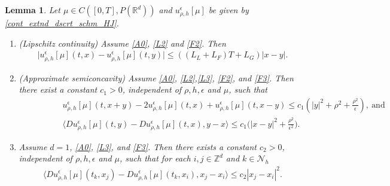 \documentclass[a4paper,  twoside, 10pt, leqno]{amsart}
\newcommand{\zd}{\mathbb{Z}^d}
\newcommand{\rd}{\mathbb{R}^d}
\newtheorem{lemma}[thm]{Lemma}
\theoremstyle{remark}
\theoremstyle{definition}
\begin{document}
\begin{lemma} \label{semiconcavity_eps}
    Let  $\mu \in  C ( [0,T], P ( \rd ))$ and $u_{\rho,h}^{\epsilon} [ \mu ]$ be given by \eqref{cont_extnd_dscrt_schm_HJ}.
\begin{enumerate}
    \item[(a)]  (Lipschitz continuity)  Assume \ref{A0}, \ref{L2} and \ref{F2}. 
         Then
 \begin{align*}
     \big|  u_{\rho, h}^{\epsilon} [ \mu ] ( t,x ) - u_{\rho, h}^{\epsilon} [ \mu ] ( t,y ) \big| \leq ( ( L_{L} + L_{F} )T + L_{G} ) |x-y|.
 \end{align*}
\item[(b)] (Approximate semiconcavity) 
        Assume \ref{A0}, \ref{L2},\ref{L3}, \ref{F2}, and \ref{F3}.
        Then  there exist a constant $c_1>0$, independent of $\rho, h, \epsilon$ and $\mu$, such that 
        \begin{align*}
            \qquad\qquad& u_{\rho, h}^{\epsilon} [ \mu ] ( t, x + y ) - 2 u_{\rho, h}^{\epsilon} [ \mu ] ( t,x ) + u_{\rho, h}^{\epsilon} [ \mu ] ( t,x - y ) \leq c_{1} (  |y|^{2} + \rho^{2} + \frac{\rho^2}{\epsilon} ), \ \mbox{and}  \\
             & \langle D u_{\rho, h}^{\epsilon} [ \mu ] (  t,y ) - D u_{\rho, h}^{\epsilon} [ \mu ] ( t,x ) , y-x \rangle \leq c_{1} \Big(|x-y|^{2} + \frac{\rho^2}{\epsilon^2}\Big).     
        \end{align*}
\item[(c)]   Assume $d=1$, \ref{A0}, \ref{L3}, and \ref{F3}. Then there exists a constant $c_{2} >0$, independent of $\rho, h, \epsilon$ and $\mu$, such that for each $i,j \in \zd$ and $k \in \mathcal  N_h$
        \begin{align*}
            \langle D u_{\rho, h}^{\epsilon} [ \mu ] (  t_k,x_j ) - D u_{\rho, h}^{\epsilon} [ \mu ] ( t_k,x_i ) , x_j-x_i \rangle \leq c_{2} |x_j-x_i|^{2}  .  
        \end{align*}
\end{enumerate}
\end{lemma}
\end{document}

